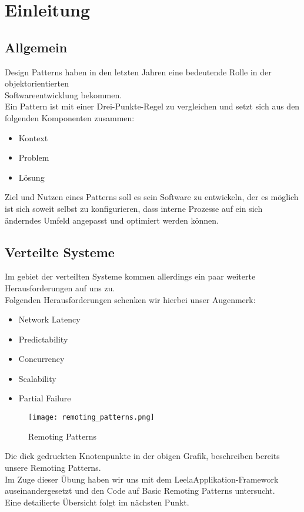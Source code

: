 \documentclass[a4paper]{article}
\begin{document}
\section{Einleitung}
\subsection{Allgemein}
Design Patterns haben in den letzten Jahren eine bedeutende Rolle in der objektorientierten\\
Softwareentwicklung bekommen.\\
Ein Pattern ist mit einer Drei-Punkte-Regel zu vergleichen und setzt sich aus den folgenden Komponenten zusammen:
\begin{itemize}
	\item Kontext
	\item Problem
	\item Lösung
\end{itemize}
Ziel und Nutzen eines Patterns soll es sein Software zu entwickeln, der es möglich ist sich soweit selbst zu konfigurieren,
dass interne Prozesse auf ein sich änderndes Umfeld angepasst und optimiert werden können.\\
\subsection{Verteilte Systeme}
Im gebiet der verteilten Systeme kommen allerdings ein paar weiterte Herausforderungen auf uns zu.\\
Folgenden Herausforderungen schenken wir hierbei unser Augenmerk:
\begin{itemize}
	\item Network Latency
	\item Predictability
	\item Concurrency
	\item Scalability
	\item Partial Failure
\end{itemize}
\begin{figure}[here!]
	\centering	\texttt{[image: remoting\_patterns.png]}
\caption{Remoting Patterns}
	\end{figure}
    Die dick gedruckten Knotenpunkte in der obigen Grafik, beschreiben bereits unsere Remoting Patterns.\\
Im Zuge dieser Übung haben wir uns mit dem LeelaApplikation-Framework auseinandergesetzt und den Code auf Basic Remoting Patterns untersucht.\\
Eine detailierte Übersicht folgt im nächsten Punkt.
\cite{martin}
\end{document}
